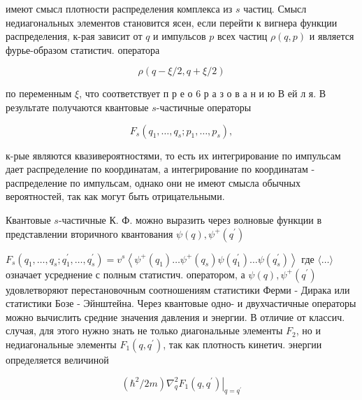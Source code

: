 \documentclass[10pt]{article}
\begin{document}
имеют смысл плотности распределения комплекса из $s$ частиц. Смысл недиагональных элементов становится ясен, если перейти к вигнера функции распределения, к-рая зависит от $q$ и импульсов $p$ всех частиц $\rho(q, p)$ и является фурье-образом статистич. оператора



\[

\rho(q-\xi / 2, q+\xi / 2)

\]



по переменным $\xi$, что соответствует п р е о 6 р а з о в а н и ю В ей л я. В результате получаются квантовые $s$-частичные операторы



\[

F_{s}\left(q_{1}, \ldots, q_{s} ; p_{1}, \ldots, p_{s}\right),

\]



к-рые являются квазивероятностями, то есть их интегрирование по импульсам дает распределение по координатам, а интегрирование по координатам - распределение по импульсам, однако они не имеют смысла обычных вероятностей, так как могут быть отрицательными.



Квантовые $s$-частичные К. Ф. можно выразить через волновые функции в представлении вторичного квантования $\psi(q), \psi^{+}\left(q^{\prime}\right)$



$F_{s}\left(q_{1}, \ldots, q_{s} ; q_{1}^{\prime}, \ldots, q_{s}^{\prime}\right)=v^{s}\left\langle\psi^{+}\left(q_{1}\right) \ldots \psi^{+}\left(q_{s}\right) \psi\left(q_{1}^{\prime}\right) \ldots \psi\left(q_{s}^{\prime}\right)\right\rangle$ где $\langle\ldots\rangle$ означает усреднение с полным статистич. оператором, а $\psi(q), \psi^{+}\left(q^{\prime}\right)$ удовлетворяют перестановочным соотношениям статистики Ферми - Дирака или статистики Бозе - Эйнштейна. Через квантовые одно- и двухчастичные операторы можно вычислить средние значения давления и энергии. В отличие от классич. случая, для этого нужно знать не только диагональные элементы $F_{2}$, но и недиагональные элементы $F_{1}\left(q, q^{\prime}\right)$, так как плотность кинетич. энергии определяется величиной



\[

\left.\left(\hbar^{2} / 2 m\right) \nabla_{q}^{2} F_{1}\left(q, q^{\prime}\right)\right|_{q=q^{\prime}}

\]
\end{document}
